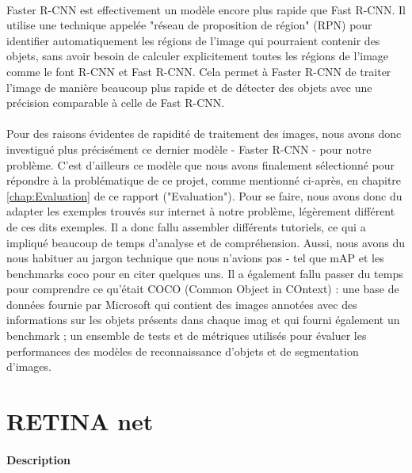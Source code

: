 \paragraph{} Faster R-CNN est effectivement un modèle encore plus rapide que Fast R-CNN. Il utilise une technique appelée "réseau de proposition de région" (RPN) pour identifier automatiquement les régions de l'image qui pourraient contenir des objets, sans avoir besoin de calculer explicitement toutes les régions de l'image comme le font R-CNN et Fast R-CNN. Cela permet à Faster R-CNN de traiter l'image de manière beaucoup plus rapide et de détecter des objets avec une précision comparable à celle de Fast R-CNN.

\paragraph{} Pour des raisons évidentes de rapidité de traitement des images, nous avons donc investigué plus précisément ce dernier modèle - Faster R-CNN - pour notre problème. C'est d'ailleurs ce modèle que nous avons finalement sélectionné pour répondre à la problématique de ce projet, comme mentionné ci-après, en chapitre \autoref{chap:Evaluation} de ce rapport ("Evaluation").\newline
Pour se faire, nous avons donc du adapter les exemples trouvés sur internet à notre problème, légèrement différent de ces dits exemples. Il a donc fallu assembler différents tutoriels, ce qui a impliqué beaucoup de temps d'analyse et de compréhension. Aussi, nous avons du nous habituer au jargon technique que nous n'avions pas - tel que mAP et les benchmarks coco pour en citer quelques uns. Il a également fallu passer du temps pour comprendre ce qu'était COCO (Common Object in COntext) : une base de données fournie par Microsoft qui contient des images annotées avec des informations sur les objets présents dans chaque imag et qui fourni également un benchmark ; un ensemble de tests et de métriques utilisés pour évaluer les performances des modèles de reconnaissance d'objets et de segmentation d'images.


\section{RETINA net}

\paragraph{Description}

